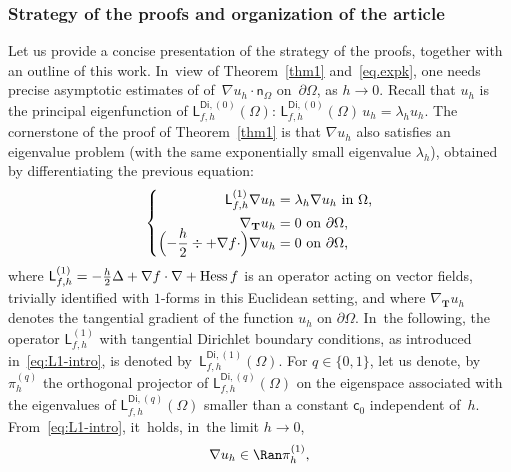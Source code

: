 \documentclass[10pt]{amsart}
\newcommand{\mbf}[1]{\mathbf{#1}}
\let\pa\partial
\theoremstyle{plain}
\theoremstyle{definition}
\begin{document}
\subsubsection*{Strategy of the proofs and organization of the article}
Let us provide a concise presentation of the strategy of the proofs,
together with an outline of this work. In~view of Theorem~\ref{thm1} and~\eqref {eq.expk}, one needs precise
asymptotic estimates of of~$\nabla u_h\cdot \mathsf
n_\Omega$ on~$\pa\Omega$, as $h\to 0$. Recall that $u_h$ is the
principal eigenfunction of $\mathsf
L^{\mathsf{Di},(0)}_{f,h}(\Omega)$: $\mathsf L^{\mathsf{Di},(0)}_{f,h}(\Omega)\, u_h = \lambda_h u_h$. The cornerstone of the proof of
Theorem~\ref{thm1} is that $\nabla u_h$ also satisfies an eigenvalue
problem (with the same exponentially small eigenvalue $\lambda_h$), obtained by differentiating the previous equation:\vspace*{-3pt}
\begin{equation}\label{eq:L1-intro}
\left\{
\begin{aligned}
\mathsf L^{(1)}_{f,h} \nabla u_h &= \lambda_h \nabla u_h \text{ in $\Omega$,}\\
\nabla_{\mbf T} u_h& = 0 \text{ on $\partial \Omega$,}\\[-7pt]
\Bigl(-\frac{h}{2} \div + \nabla f \cdot \Bigr) \nabla u_h & = 0 \text{ on $\partial \Omega$,}\\
\end{aligned}
\right.
\end{equation}
where $
\mathsf L^{(1)}_{f,h}=- \frac{h}{2} \Delta + \nabla f \cdot \nabla + {\rm
Hess} \, f$
is an operator acting on vector fields, trivially identified with
$1$-forms in this Euclidean setting, and where $\nabla_{\mbf T}u_h$ denotes the tangential gradient of the function $u_h$ on $\partial \Omega$. In~the
following, the operator $\mathsf L^{(1)}_{f,h}$ with tangential Dirichlet
boundary conditions, as introduced in~\eqref{eq:L1-intro}, is denoted
by~$\mathsf L^{\mathsf{Di},(1)}_{f,h}(\Omega)$.
For $q\in\{0,1\}$, let us denote, by~$ \pi_h^{(q)}$ the orthogonal
projector of $\mathsf L^{\mathsf{Di},(q)}_{f,h}(\Omega)$ on the
eigenspace associated with the eigenvalues of $\mathsf
L^{\mathsf{Di},(q)}_{f,h}(\Omega)$ smaller than a constant $\mathsf
c_0$ independent of~$h$. From~\eqref{eq:L1-intro}, it~holds, in~the
limit $h \to 0$,\vspace*{-3pt}
\begin{equation}\label{eq.nu-in}
\nabla u_h\in \Ran \pi_h^{(1)},
\end{equation}
\end{document}
